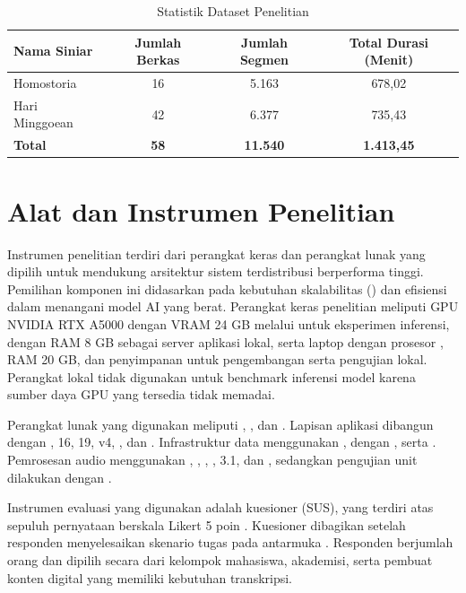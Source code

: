 \begin{table}[h]
    \centering
    \caption{Statistik Dataset Penelitian}
    \begin{tabular}{|l|c|c|c|}
        \hline
        \textbf{Nama Siniar} & \textbf{Jumlah Berkas} & \textbf{Jumlah Segmen} & \textbf{Total Durasi (Menit)} \\ \hline
        Homostoria & 16 & 5.163 & 678,02 \\ \hline
        Hari Minggoean & 42 & 6.377 & 735,43 \\ \hline
        \textbf{Total} & \textbf{58} & \textbf{11.540} & \textbf{1.413,45} \\ \hline
    \end{tabular}
\end{table}

\section{Alat dan Instrumen Penelitian}
Instrumen penelitian terdiri dari perangkat keras dan perangkat lunak yang dipilih untuk mendukung arsitektur sistem terdistribusi berperforma tinggi. Pemilihan komponen ini didasarkan pada kebutuhan skalabilitas () dan efisiensi dalam menangani model AI yang berat.
Perangkat keras penelitian meliputi GPU NVIDIA RTX A5000 dengan VRAM 24 GB melalui  untuk eksperimen inferensi,  dengan RAM 8 GB sebagai server aplikasi lokal, serta laptop  dengan prosesor , RAM 20 GB, dan penyimpanan  untuk pengembangan serta pengujian lokal. Perangkat lokal tidak digunakan untuk benchmark inferensi model karena sumber daya GPU yang tersedia tidak memadai.

Perangkat lunak yang digunakan meliputi , , dan . Lapisan aplikasi dibangun dengan ,  16,  19,  v4, , dan . Infrastruktur data menggunakan ,  dengan , serta . Pemrosesan audio menggunakan , , , ,  3.1, dan , sedangkan pengujian unit dilakukan dengan .

Instrumen evaluasi yang digunakan adalah kuesioner  (SUS), yang terdiri atas sepuluh pernyataan berskala Likert 5 poin \citep{brooke_sus_1986}. Kuesioner dibagikan setelah responden menyelesaikan skenario tugas pada antarmuka \namasistem{}. Responden berjumlah \jumlahresponden{} orang dan dipilih secara  dari kelompok mahasiswa, akademisi, serta pembuat konten digital yang memiliki kebutuhan transkripsi.

